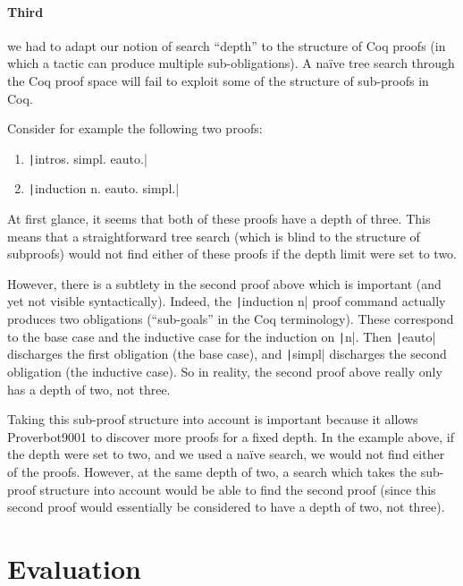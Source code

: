 \documentclass[sigplan,screen]{acmart}
\newcommand{\name}{Proverbot9001\xspace}
\newcommand{\coqinline}[1]{\texttt|#1|}
\renewcommand{\>}{\quad}
\begin{document}
\paragraph{Third} we had to adapt our notion of search ``depth'' to the
structure of Coq proofs (in which a tactic can produce multiple
sub-obligations).
A na\"ive tree search through the Coq proof space will fail to exploit some of the structure of sub-proofs in Coq.

Consider for example the following two proofs:
\begin{enumerate}
\item \coqinline{intros. simpl. eauto.}
\item \coqinline{induction n. eauto. simpl.}
\end{enumerate}
At first glance, it seems that both of these proofs have a depth of three.
This means that a straightforward tree search (which is blind to the structure of subproofs) would not find either of these proofs if the depth limit were set to two.

However, there is a subtlety in the second proof above which is important (and yet not visible syntactically).
Indeed, the \coqinline{induction n} proof command actually produces two obligations (``sub-goals'' in the Coq terminology).
These correspond to the base case and the inductive case for the induction on \coqinline{n}.
Then \coqinline{eauto} discharges the first obligation (the base case), and \coqinline{simpl} discharges the second obligation (the inductive case).
So in reality, the second proof above really only has a depth of two, not three.

Taking this sub-proof structure into account is important because it allows \name{} to discover more proofs for a fixed depth.
In the example above, if the depth were set to two, and we used a na\"ive search, we would not find either of the proofs.
However, at the same depth of two, a search which takes the sub-proof structure into account would be able to find the second proof (since this second proof would essentially be considered to have a depth of two, not three).













 \section{Evaluation}
\label{sec:evaluation}
\end{document}
